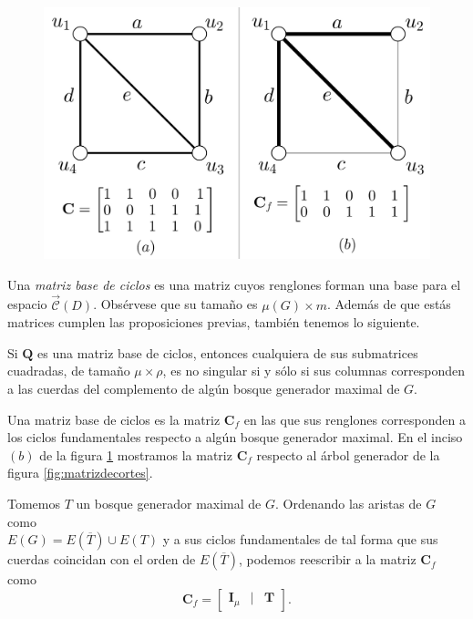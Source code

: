 \begin{figure}[H]
    \centering
    \includegraphics[scale=0.25]{img/imgchapter4/matrizdeciclos.jpg}
    \caption{}
    \label{fig:matrizdeciclos}
\end{figure}

Una \textit{matriz base de ciclos} es una matriz cuyos renglones forman una base para el espacio $\overrightarrow{\mathcal{C}}(D)$. Obsérvese que su tamaño es $\mu(G) \times m$. Además de que estás matrices cumplen las proposiciones previas, también tenemos lo siguiente.

\begin{teo} \label{teo:submatricesmatridecortes}
Si $\mathbf{Q}$ es una matriz base de ciclos, entonces cualquiera de sus submatrices cuadradas, de tamaño $\mu \times \rho$, es no singular si y sólo si sus columnas corresponden a las cuerdas del complemento de algún bosque generador maximal de $G$.
\end{teo}

Una matriz base de ciclos es la matriz $\mathbf{C}_{f}$ en las que sus renglones corresponden a los ciclos fundamentales respecto a algún bosque generador maximal. En el inciso $(b)$ de la figura \ref{fig:matrizdeciclos} mostramos la matriz $\mathbf{C}_{f}$ respecto al árbol generador de la figura \ref{fig:matrizdecortes}.

Tomemos $T$ un bosque generador maximal de $G$. Ordenando las aristas de $G$ como \\$E(G) = E(\overline{T}) \cup E(T)$ y a sus ciclos fundamentales de tal forma que sus cuerdas coincidan con el orden de $E(\overline{T})$, podemos reescribir a la matriz $\mathbf{C}_{f}$ como
$$
\mathbf{C}_{f} = \begin{bmatrix}
\mathbf{I}_{\mu} & | & \mathbf{T}
\end{bmatrix}.
$$

